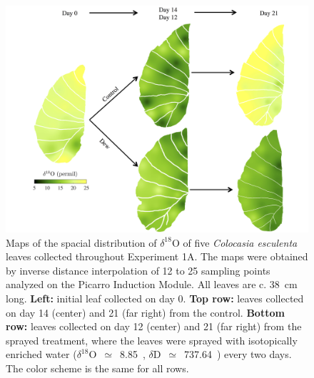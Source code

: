\documentclass[twoside]{article}
\begin{document}
\begin{center}
	\begin{figure}[h!]
		\centering
		\includegraphics[width=\textwidth]{Final_18O_Plot_GoodQ.jpg}
		\caption{Maps of the spacial distribution of $\delta^{\text{18}}$O of five \textit{Colocasia esculenta} leaves collected throughout Experiment 1A. The maps were obtained by inverse distance interpolation of 12 to 25 sampling points analyzed on the Picarro Induction Module. All leaves are c. 38~cm long. \textbf{Left:} initial leaf collected on day 0. \textbf{Top row:} leaves collected on day 14 (center) and 21 (far right) from the control. \textbf{Bottom row:} leaves collected on day 12 (center) and 21 (far right) from the sprayed treatment, where the leaves were sprayed with isotopically enriched water ($\delta^{18}$O~$\simeq$~8.85~\textperthousand, $\delta$D~$\simeq$~737.64~\textperthousand) every two days. The color scheme is the same for all rows.}\label{expe1A18O}
	\end{figure}
\end{center}
\end{document}
